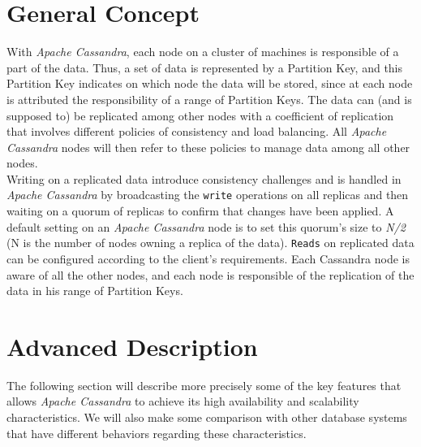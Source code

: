 \documentclass[a4paper]{report}
\newcommand{\ca}{\emph{Apache Cassandra\xspace}}
\begin{document}
\section{General Concept}
With \ca{}, each node on a cluster of machines is responsible of a part of the data. Thus, a set of data is represented by a Partition Key, and this Partition Key indicates on which node the data will be stored, since at each node is attributed the responsibility of a range of Partition Keys. The data can (and is supposed to) be replicated among other nodes with a coefficient of replication that involves different policies of consistency and load balancing. All \ca{} nodes will then refer to these policies to manage data among all other nodes.\\
Writing on a replicated data introduce consistency challenges and is handled in \ca{} by broadcasting the \verb;write; operations on all replicas and then waiting on a quorum of replicas to confirm that changes have been applied. A default setting on an \ca{} node is to set this quorum's size to \emph{N/2} (N is the number of nodes owning a replica of the data). \verb;Reads; on replicated data can be configured according to the client's requirements. Each Cassandra node is aware of all the other nodes, and each node is responsible of the replication of the data in his range of Partition Keys.

\section{Advanced Description}
The following section will describe more precisely some of the key features that allows \ca{} to achieve its high availability and scalability characteristics. We will also make some comparison with other database systems that have different behaviors regarding these characteristics.
\end{document}
